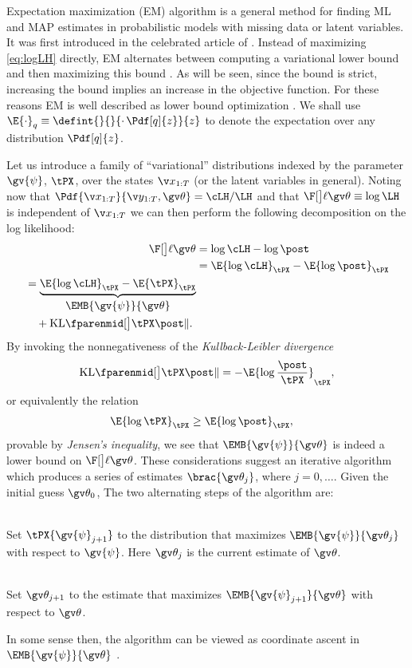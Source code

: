 
Expectation maximization (EM) algorithm is a general
method for finding ML and MAP estimates in probabilistic models with missing data or
latent variables. It was first introduced in
the celebrated article of \textcite{Dempster1977}. Instead of maximizing
\eqref{eq:logLH} directly, EM alternates between computing a variational lower bound and then maximizing this bound
\parencite{Bishop2006,barber2012bayesian}. As will be seen, since the bound is strict, increasing the bound implies
an increase in the objective function. For these reasons EM is well described as lower bound optimization \parencite{Minka1998}.
We shall use $\E{\cdot}_{q}\equiv\defint{}{}{\cdot\,\Pdf[q]{z}}{z}$ to denote the expectation
over any distribution $\Pdf[q]{z}$.

Let us introduce a family of ``variational'' distributions 
indexed by the parameter $\gv{\psi}$, $\tPX$, over the states $\X$ (or the latent variables in general).
Noting now that $\Pdf{\X}{\Y,\Th}=\cLH/\LH$ and that $\lLH\equiv\log\LH$ is independent of $\X$ we can then perform the
following decomposition on the log likelihood:
\begin{align}
	\lLH &= \log\cLH - \log\post \nonumber\\
	&= \E{\log\cLH}_{\tPX} - \E{\log\post}_{\tPX} \nonumber\\ 
	\begin{split}
	&=\underbrace{\E{\log\cLH}_{\tPX} - \E{\tPX}_{\tPX}}_{\displaystyle \EMB{\gv{\psi}}{\Th}}\\
	&\quad+\KL{\tPX}{\post}. 
	\end{split}
	\label{eq:lLH_decomp}
\end{align}
By invoking the nonnegativeness of
the \emph{Kullback-Leibler divergence}
\begin{align}
		\KL{\tPX}{\post} = -\E{\log{\frac{\post}{\tPX}}}_{\tPX},  
\end{align}
or equivalently the relation
\begin{align}
	\E{\log\tPX}_{\tPX} &\geq \E{\log\post}_{\tPX},	
\end{align}
provable by \emph{Jensen's inequality}, 
we see that $\EMB{\gv{\psi}}{\Th}$ is indeed a lower bound on $\lLH$. 
These considerations suggest an iterative algorithm
which produces a series of estimates $\brac{\Th_j}$, where $j=0,\dots$.
Given the initial guess $\Th_0$, The two alternating
steps of the algorithm are:
%
\begin{description}
\addtolength{\leftskip}{1cm}
  \item[E-step]\hfill\\
  Set $\tPX{\gv{\psi}_{j+1}}$ to the distribution that maximizes $\EMB{\gv{\psi}}{\Th_j}$
  with respect to $\gv{\psi}$. Here $\Th_j$ is the current estimate of $\Th$.  
  \item[M-step]\hfill\\ 
  Set $\Th_{j+1}$ to the estimate that maximizes $\EMB{\gv{\psi}_{j+1}}{\Th}$ with respect to $\Th$.
\end{description}%
In some sense then, the algorithm can be viewed as coordinate ascent in $\EMB{\gv{\psi}}{\Th}$ \parencite{Neala1998}. 

